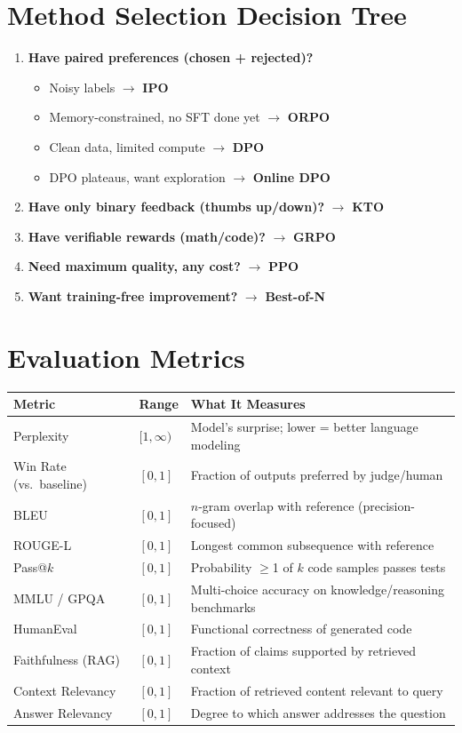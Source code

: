 \section{Method Selection Decision Tree}
\label{method-selection-decision-tree}

\begin{enumerate}
  \item \textbf{Have paired preferences (chosen + rejected)?}

\begin{itemize}
  \item Noisy labels $\rightarrow$ \textbf{IPO}
  \item Memory-constrained, no SFT done yet $\rightarrow$ \textbf{ORPO}
  \item Clean data, limited compute $\rightarrow$ \textbf{DPO}
  \item DPO plateaus, want exploration $\rightarrow$ \textbf{Online DPO}
\end{itemize}
  \item \textbf{Have only binary feedback (thumbs up/down)?} $\rightarrow$ \textbf{KTO}
  \item \textbf{Have verifiable rewards (math/code)?} $\rightarrow$ \textbf{GRPO}
  \item \textbf{Need maximum quality, any cost?} $\rightarrow$ \textbf{PPO}
  \item \textbf{Want training-free improvement?} $\rightarrow$ \textbf{Best-of-N}
\end{enumerate}

\section{Evaluation Metrics}
\label{evaluation-metrics}

\begin{tabular}{@{}lp{5cm}p{8cm}@{}}
\toprule
\textbf{Metric} & \textbf{Range} & \textbf{What It Measures} \\
\midrule
Perplexity & $[1, \infty)$ & Model’s surprise; lower = better language modeling \\
Win Rate (vs.~baseline) & $[0, 1]$ & Fraction of outputs preferred by judge/human \\
BLEU & $[0, 1]$ & $n$-gram overlap with reference (precision-focused) \\
ROUGE-L & $[0, 1]$ & Longest common subsequence with reference \\
Pass@$k$ & $[0, 1]$ & Probability $\geq$1 of $k$ code samples passes tests \\
MMLU / GPQA & $[0, 1]$ & Multi-choice accuracy on knowledge/reasoning benchmarks \\
HumanEval & $[0, 1]$ & Functional correctness of generated code \\
Faithfulness (RAG) & $[0, 1]$ & Fraction of claims supported by retrieved context \\
Context Relevancy & $[0, 1]$ & Fraction of retrieved content relevant to query \\
Answer Relevancy & $[0, 1]$ & Degree to which answer addresses the question \\
\bottomrule
\end{tabular}

